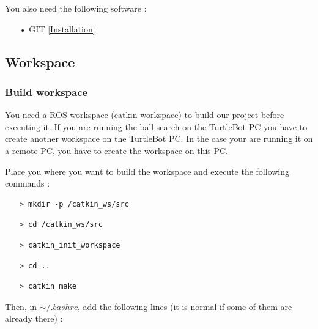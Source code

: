 \documentclass[10pt,a4paper]{article}
\begin{document}
You also need the following software :

\begin{itemize}
\item[•] GIT \href{https://git-scm.com/download/linux}{[Installation]} 
\end{itemize}

\subsection{Workspace}

\subsubsection{Build workspace}

You need a ROS workspace (catkin workspace) to build our project before executing it. If you are running the ball search on the TurtleBot PC you have to create another workspace on the TurtleBot PC. In the case your are running it on a remote PC, you have to create the workspace on this PC.\

Place you where you want to build the workspace and execute the following commands :

\begin{itemize}
\item[]  \begin{verbatim}> mkdir -p /catkin_ws/src \end{verbatim}
\item[]  \begin{verbatim}> cd /catkin_ws/src \end{verbatim}
\item[]  \begin{verbatim}> catkin_init_workspace \end{verbatim}
\item[]  \begin{verbatim}> cd .. \end{verbatim}
\item[]  \begin{verbatim}> catkin_make \end{verbatim}
\end{itemize}

Then, in $\sim/.bashrc$, add the following lines (it is normal if some of them are already there) :
\end{document}
